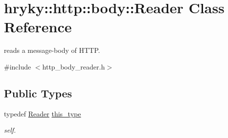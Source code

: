 \hypertarget{classhryky_1_1http_1_1body_1_1_reader}{\section{hryky\-:\-:http\-:\-:body\-:\-:Reader Class Reference}
\label{classhryky_1_1http_1_1body_1_1_reader}
}


reads a message-\/body of H\-T\-T\-P.  




{\ttfamily \#include $<$http\-\_\-body\-\_\-reader.\-h$>$}

\subsection*{Public Types}
\begin{DoxyCompactItemize}
\item 
\hypertarget{classhryky_1_1http_1_1body_1_1_reader_ab81eae48a1c2e78cf613bffd7180400c}{typedef \hyperlink{classhryky_1_1http_1_1body_1_1_reader}{Reader} \hyperlink{classhryky_1_1http_1_1body_1_1_reader_ab81eae48a1c2e78cf613bffd7180400c}{this\-\_\-type}}\label{classhryky_1_1http_1_1body_1_1_reader_ab81eae48a1c2e78cf613bffd7180400c}

\begin{DoxyCompactList}\small\item\em self. \end{DoxyCompactList}\end{DoxyCompactItemize}
